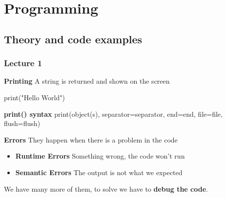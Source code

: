 \section{Programming}
\subsection{Theory and code examples}

\subsubsection{Lecture 1}

\textbf{Printing} \ra A string is returned and shown on the screen
\begin{pythoncode}
    print("Hello World")
\end{pythoncode}

\textbf{print() syntax} \ra print(object(s), separator=separator, end=end, file=file, flush=flush)

\vspace{20pt}

\textbf{Errors} \ra They happen when there is a problem in the code

\begin{itemize}
    \item \textbf{Runtime Errors} \ra Something wrong, the code won't run 
    \item \textbf{Semantic Errors} \ra The output is not what we expected
    
\end{itemize}

We have many more of them, to solve we have to \textbf{debug the code}.

\vspace{20pt}

